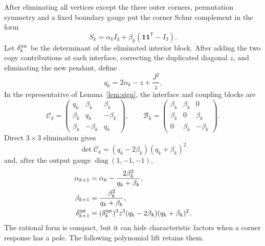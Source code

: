 \documentclass[11pt]{article}
\theoremstyle{remark}
\newcommand{\ones}{\boldsymbol{1}}
\begin{document}
After eliminating all vertices except the three outer corners, permutation
symmetry and a fixed boundary gauge put the corner Schur complement in the
form
\begin{equation}
 S_k=\alpha_k I_3+\beta_k(\ones\ones^{\mathsf T}-I_3).
 \label{eq:corner-response}
\end{equation}
Let $\delta_k^{\rm int}$ be the determinant of the eliminated interior block.  After adding
the two copy contributions at each interface, correcting the duplicated
diagonal $z$, and eliminating the new pendant, define
\begin{equation}
 q_k=2\alpha_k-z+\frac{J^2}{z}.
 \label{eq:q-def}
\end{equation}
In the representative of Lemma~\ref{lem:sign}, the interface and coupling blocks
are
\begin{equation}
 \mathcal C_k=
 \begin{pmatrix}
 q_k&\beta_k&\beta_k\\
 \beta_k&q_k&-\beta_k\\
 \beta_k&-\beta_k&q_k
 \end{pmatrix},\qquad
 \mathcal B_k=
 \begin{pmatrix}
 \beta_k&\beta_k&0\\
 \beta_k&0&\beta_k\\
 0&\beta_k&-\beta_k
 \end{pmatrix}.
 \label{eq:interface-blocks}
\end{equation}
Direct $3\times3$ elimination gives
\begin{equation}
 \det\mathcal C_k=(q_k-2\beta_k)(q_k+\beta_k)^2
 \label{eq:interface-det}
\end{equation}
and, after the output gauge $\operatorname{diag}(1,-1,-1)$,
\begin{subequations}
\label{eq:rational-update}
\begin{align}
 \alpha_{k+1}&=\alpha_k-\frac{2\beta_k^2}{q_k+\beta_k},\\
 \beta_{k+1}&=\frac{\beta_k^2}{q_k+\beta_k},\\
 \delta_{k+1}^{\rm int}&=(\delta_k^{\rm int})^3z^3
 (q_k-2\beta_k)(q_k+\beta_k)^2.
\end{align}
\end{subequations}
The rational form is compact, but it can hide characteristic factors when a
corner response has a pole.  The following polynomial lift retains them.
\end{document}
